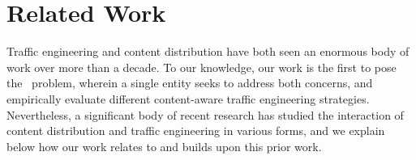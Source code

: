 
%
%
%



\section{Related Work}
\label{sec:related}

Traffic engineering and content distribution have both seen an enormous body of work over more than a decade. To our knowledge, our work is the first to pose the \ncp\ problem, wherein a single entity seeks to address both concerns, and empirically evaluate different content-aware traffic engineering strategies. Nevertheless, a significant body of recent research has studied the interaction of content distribution and traffic engineering in various forms, and we explain below how our work relates to and builds upon this prior work.


